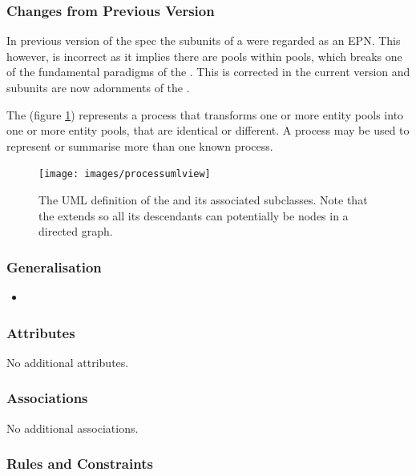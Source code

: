 \subsubsection{Changes from Previous Version}

In previous version of the spec the subunits of a 
were regarded as an EPN. This however, is incorrect as it implies
there are pools within pools, which breaks one of the fundamental
paradigms of the \PDl. This is corrected in the current version and
subunits are now adornments of the .

\label{sec:techref:PNs}
\label{defn:ProcessNode}

The  (figure \ref{fig:techref:processumlview}) represents a
process that transforms one or more entity pools into one or more
entity pools, that are identical or different. A process may be used
to represent or summarise more than one known process.

\begin{figure}[htb]
  \centering
  \texttt{[image: images/processumlview]}
  \caption{The UML definition of the  and its
    associated subclasses. Note that the  extends
     so all its descendants can potentially be
    nodes in a directed graph.}
  \label{fig:techref:processumlview}
\end{figure}


\subsubsection{Generalisation}

\begin{itemize}
\item {}
\end{itemize}

\subsubsection{Attributes}

No additional attributes.

\subsubsection{Associations}

No additional associations.

\subsubsection{Rules and Constraints}

